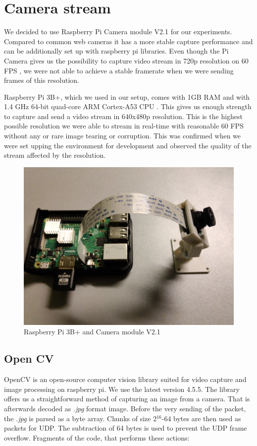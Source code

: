 \documentclass{ctuthesis}
\begin{document}
\section{Camera stream} \label {camera}
We decided to use Raspberry Pi Camera module V2.1 for our experiments. Compared to common web cameras it has a more stable capture performance and can be additionally set up with raspberry pi libraries. Even though the Pi Camera gives us the possibility to capture video stream in 720p resolution on 60 FPS \cite{2}, we were not able to achieve a stable framerate when we were sending frames of this resolution.

Raspberry Pi 3B+, which we used in our setup, comes with 1GB RAM and with 1.4 GHz 64-bit quad-core ARM Cortex-A53 CPU \cite{1}. This gives us enough strength to capture and send a video stream in 640x480p resolution. This is the highest possible resolution we were able to stream in real-time with reasonable 60 FPS without any or rare image tearing or corruption. This was confirmed when we were set upping the environment for development and observed the quality of the stream affected by the resolution.



\begin{figure}[H]
	\centering
	\includegraphics[width=0.8\linewidth]{rPi.jpeg}
	\caption{Raspberry Pi 3B+ and Camera module V2.1}
	\label{fig:raspberry}
\end{figure}

\subsection{Open CV}
OpenCV is an open-source computer vision library suited for video capture and image processing on raspberry pi\cite{3}. We use the latest version 4.5.5. The library offers us a straightforward method of capturing an image from a camera. That is afterwards decoded as \textit{.jpg} format image. Before the very sending of the packet, the \textit{.jpg} is parsed as a byte array. Chunks of size 2$^{16}$-64 bytes are then used as packets for UDP. The subtraction of 64 bytes is used to prevent the UDP frame overflow. Fragments of the code, that performs these actions:
\end{document}
